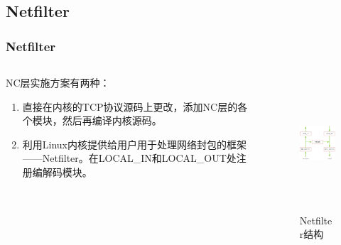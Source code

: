 \subsection{Netfilter}
%
\begin{frame}
	\frametitle{Netfilter}

	\begin{columns}
		\begin{column}{0.5\textwidth}
			NC层实施方案有两种：
			\begin{enumerate}
				\item 直接在内核的TCP协议源码上更改，添加NC层的各个模块，然后再编译内核源码。
				\item 利用Linux内核提供给用户用于处理网络封包的框架——Netfilter。在LOCAL\_IN和LOCAL\_OUT处注册编解码模块。
			\end{enumerate}
		\end{column}
		\begin{column}{0.4\textwidth}
			\vspace{-1.5em}
			\begin{figure}
				\includegraphics[height=5cm]{../figures/netfilter.png}
				\caption{Netfilter结构}
				\label{fig:packetflow}
			\end{figure}
		\end{column}
	\end{columns}

	\note{
	}
\end{frame}
